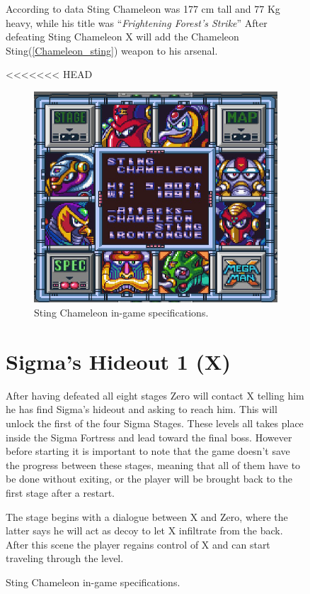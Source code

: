 \begin{figure}[htp]
According to data Sting Chameleon was 177 cm tall and 77 Kg heavy, while his title was ``\textit{Frightening Forest's Strike}''
After defeating Sting Chameleon X will add the Chameleon Sting(\ref{Chameleon_sting}) weapon to his arsenal.

<<<<<<< HEAD
\begin{figure}[htp]
	\centering
	\includegraphics[width=0.4\linewidth]{figures/X1/Sting_chameleon/Sting_chameleon_specs.png}
	\caption{Sting Chameleon in-game specifications.}
\end{figure}

\section{Sigma's Hideout 1 (X)}
After having defeated all eight stages Zero will contact X telling him he has find Sigma's hideout and asking to reach him. This will unlock the first of the four Sigma Stages. These levels all takes place inside the Sigma Fortress and lead toward the final boss. However before starting it is important to note that the game doesn't save the progress between these stages, meaning that all of them have to be done without exiting, or the player will be brought back to the first stage after a restart.

The stage begins with a dialogue between X and Zero, where the latter says he will act as decoy to let X infiltrate from the back. After this scene the player regains control of X and can start traveling through the level. 


\end{figure}
